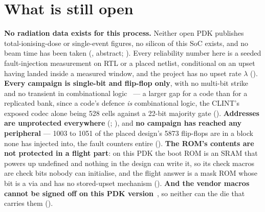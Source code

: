 \section{What is still open}
\label{sec:harden-open}

\textbf{No radiation data exists for this process.} Neither open PDK
publishes total-ionising-dose or single-event figures, no silicon of
this SoC exists, and no beam time has been taken
(, abstract; ). Every reliability
number here is a seeded fault-injection measurement on RTL or a placed
netlist, conditional on an upset having landed inside a measured window,
and the project has no upset rate $\lambda$ ().
\textbf{Every campaign is single-bit and flip-flop only}, with no
multi-bit strike and no transient in combinational
logic~\cite{shivakumar2002} --- a larger
gap for a code than for a replicated bank, since a code's defence
\emph{is} combinational logic, the CLINT's exposed codec alone being 528
cells against a 22-bit majority gate ().
\textbf{Addresses are unprotected everywhere}
(; ), and \textbf{no campaign
has reached any peripheral} --- \num{1003} to \num{1051} of the placed
design's \num{5873} flip-flops are in a block none has injected into,
the fault counters entire ().
\textbf{The ROM's contents are
not protected in a flight part}: on this PDK the boot ROM is an SRAM
that powers up undefined and nothing in the design can write it, so its
check macros are check bits nobody can initialise, and the flight answer
is a mask ROM whose bit is a via and has no stored-upset mechanism
(). \textbf{And the vendor macros cannot be signed
off on this PDK version}~\cite{ihppdk}, so neither can the die that carries them
().
